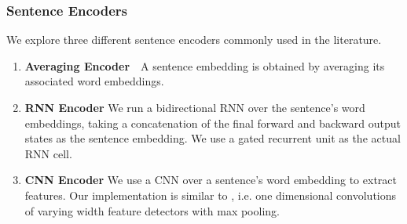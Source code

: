 
\subsubsection{Sentence Encoders}
We explore three different sentence encoders commonly used in the literature.
\begin{enumerate}
    \item \textbf{Averaging Encoder}~~A sentence embedding is obtained by
        averaging its associated word embeddings. 
    \item \textbf{RNN Encoder} We run a bidirectional RNN over the sentence's
        word embeddings, taking a concatenation of the final forward 
        and backward output states as the sentence embedding.
        We use a gated
        recurrent unit \cite{cho2014learning} as the actual RNN cell.
    \item \textbf{CNN Encoder} We use a CNN over a sentence's word embedding
        to extract \ngram{} features. Our implementation is similar to 
        \cite{kim2014convolutional}, i.e.  one dimensional convolutions of 
        varying width \ngram{} feature detectors with max pooling.
\end{enumerate}



